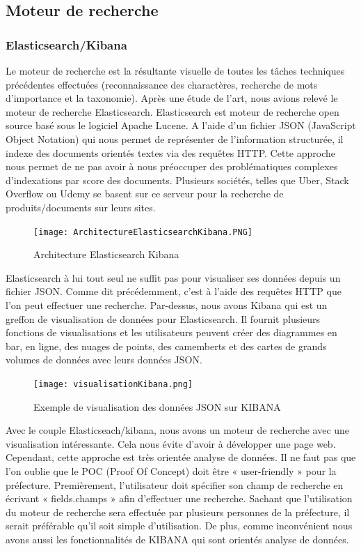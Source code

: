  

\subsection{Moteur de recherche} %
\subsubsection{Elasticsearch/Kibana}
Le moteur de recherche est la résultante visuelle de toutes les tâches techniques précédentes effectuées (reconnaissance des charactères, recherche de mots d’importance et la taxonomie). Après une étude de l’art, nous avions relevé le moteur de recherche Elasticsearch. 
Elasticsearch est moteur de recherche open source basé sous le logiciel Apache Lucene. A l’aide d’un fichier JSON (JavaScript Object Notation) qui nous permet de représenter de l’information structurée, il indexe des documents orientés textes via des requêtes HTTP. Cette approche nous permet de ne pas avoir à nous préoccuper des problématiques complexes d’indexations par score des documents. Plusieurs sociétés, telles que Uber, Stack Overflow ou Udemy se basent sur ce serveur pour la recherche de produits/documents sur leurs sites. 

\begin{figure}[h!]
  \centering
  \texttt{[image: ArchitectureElasticsearchKibana.PNG]}
	\caption[]{Architecture Elasticsearch Kibana}
  \label{}
\end{figure}


Elasticsearch à lui tout seul ne suffit pas pour visualiser ses données depuis un fichier JSON. Comme dit précédemment, c’est à l’aide des requêtes HTTP que l’on peut effectuer une recherche. Par-dessus, nous avons Kibana qui est un greffon de visualisation de données pour Elasticsearch. Il fournit plusieurs fonctions de visualisations et les utilisateurs peuvent créer des diagrammes en bar, en ligne, des nuages de points, des camemberts et des cartes de grands volumes de données avec leurs données JSON.

\begin{figure}[h!]
  \centering
  \texttt{[image: visualisationKibana.png]}
	\caption[]{Exemple de visualisation des données JSON sur KIBANA}
  \label{}
\end{figure}


Avec le couple Elasticseach/kibana, nous avons un moteur de recherche avec une visualisation intéressante. Cela nous évite d’avoir à développer une page web. 
Cependant, cette approche est très orientée analyse de données. Il ne faut pas que l’on oublie que le POC (Proof Of Concept) doit être « user-friendly » pour la préfecture. Premièrement, l’utilisateur doit spécifier son champ de recherche en écrivant « fields.champs » afin d’effectuer une recherche. Sachant que l’utilisation du moteur de recherche sera effectuée par plusieurs personnes de la préfecture, il serait préférable qu’il soit simple d’utilisation. De plus, comme inconvénient nous avons aussi les fonctionnalités de KIBANA qui sont orientés analyse de données.

